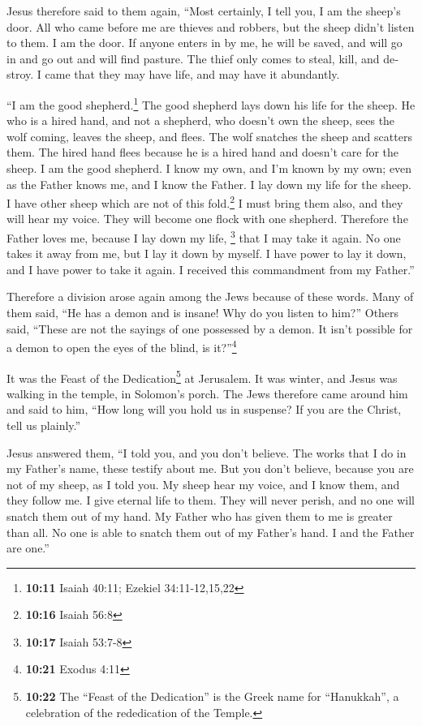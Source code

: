 \begin{paracol}{2}
\begin{otherlanguage}{english}
 Jesus therefore said to them again, ``Most certainly, I
tell you, I am the sheep's door.  All who came before me
are thieves and robbers, but the sheep didn't listen to them.
 I am the door. If anyone enters in by me, he will be
saved, and will go in and go out and will find pasture. 
The thief only comes to steal, kill, and destroy. I came that they may
have life, and may have it abundantly.

 ``I am the good shepherd.\footnote{\textbf{10:11} Isaiah
  40:11; Ezekiel 34:11-12,15,22} The good shepherd lays down his life
for the sheep.  He who is a hired hand, and not a
shepherd, who doesn't own the sheep, sees the wolf coming, leaves the
sheep, and flees. The wolf snatches the sheep and scatters them.
 The hired hand flees because he is a hired hand and
doesn't care for the sheep.  I am the good shepherd. I
know my own, and I'm known by my own;  even as the Father
knows me, and I know the Father. I lay down my life for the sheep.
 I have other sheep which are not of this
fold.\footnote{\textbf{10:16} Isaiah 56:8} I must bring them also, and
they will hear my voice. They will become one flock with one shepherd.
 Therefore the Father loves me, because I lay down my
life, \footnote{\textbf{10:17} Isaiah 53:7-8} that I may take it again.
 No one takes it away from me, but I lay it down by
myself. I have power to lay it down, and I have power to take it again.
I received this commandment from my Father.''

 Therefore a division arose again among the Jews because
of these words.  Many of them said, ``He has a demon and
is insane! Why do you listen to him?''  Others said,
``These are not the sayings of one possessed by a demon. It isn't
possible for a demon to open the eyes of the blind, is it?''\footnote{\textbf{10:21}
  Exodus 4:11}

 It was the Feast of the Dedication\footnote{\textbf{10:22}
  The ``Feast of the Dedication'' is the Greek name for ``Hanukkah'', a
  celebration of the rededication of the Temple.} at Jerusalem.
 It was winter, and Jesus was walking in the temple, in
Solomon's porch.  The Jews therefore came around him and
said to him, ``How long will you hold us in suspense? If you are the
Christ, tell us plainly.''

 Jesus answered them, ``I told you, and you don't
believe. The works that I do in my Father's name, these testify about
me.  But you don't believe, because you are not of my
sheep, as I told you.  My sheep hear my voice, and I know
them, and they follow me.  I give eternal life to them.
They will never perish, and no one will snatch them out of my hand.
 My Father who has given them to me is greater than all.
No one is able to snatch them out of my Father's hand.  I
and the Father are one.''


\end{otherlanguage}
\end{paracol}

